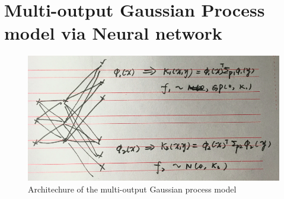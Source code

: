 \section{Multi-output Gaussian Process model via Neural network}

\begin{figure}[!htb]
    \centering
    \includegraphics[width=\columnwidth]{./img/NN-MOGP.png}
    \caption{Architechure of the multi-output Gaussian process model}
\end{figure}
